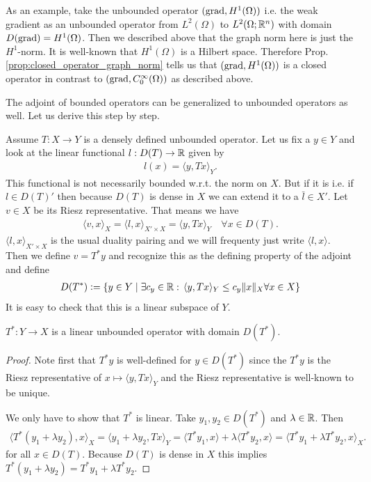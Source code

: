 \documentclass[../main.tex]{subfiles}
\begin{document}
As an example, take the unbounded operator $(\operatorname{grad}, H^1(\Omega))$
i.e. the weak gradient as an unbounded operator 
from $L^2(\Omega)$ to $L^2(\Omega;\mathbb{R}^n)$ with 
domain $D(\operatorname{grad}) = H^1(\Omega)$. Then we described above that the 
graph norm here is just the $H^1$-norm. It is well-known that 
$H^1(\Omega)$ is a Hilbert space. Therefore 
Prop.\,\ref{prop:closed_operator_graph_norm} tells us that 
$(\operatorname{grad}, H^1(\Omega))$ is a closed operator in contrast to 
$(\operatorname{grad}, C_0^\infty(\Omega))$ as described above.

The adjoint of bounded operators can be generalized to unbounded operators 
as well. Let us derive this step by step. 

Assume $T: X \rightarrow Y$ is a densely defined unbounded operator. 
Let us fix a $y \in Y$ and 
look at the linear functional $l:D(T) \rightarrow \mathbb{R}$ given by
\begin{align*}
    l(x) = \langle y, Tx \rangle_Y.
\end{align*}
This functional is not necessarily bounded w.r.t. the norm on $X$. But if it is i.e. if $l \in D(T)'$ 
then because $D(T)$ is dense in $X$ we can extend it to a
$\bar{l} \in X'$. Let $v \in X$ be its Riesz representative. That means we have
\begin{align*}
    \langle v, x \rangle_X = \langle l, x \rangle_{X'\times X} = \langle y, Tx \rangle_Y 
        \quad \forall x \in D(T).
\end{align*}
$\langle l, x \rangle_{X'\times X}$ is the usual duality pairing and we will 
frequenty just write $\langle l, x \rangle$.
Then we define $v = T^* y$ and 
recognize this as the defining property of the adjoint and define 
\begin{align*}
    D(T^*) \vcentcolon= \{ y \in Y \mid \exists c_y \in \mathbb{R}:
        \,\langle y, Tx \rangle_Y \leq c_y \lVert x \rVert _X \forall x \in X\}
\end{align*}
It is easy to check that this is a linear subspace of $Y$.

\begin{proposition}
    $T^*: Y \rightarrow X $ is a linear unbounded operator with domain $D(T^*)$.
\end{proposition}
\begin{proof}
    Note first that $T^*y$ is well-defined for $y \in D(T^*)$ since the 
    $T^*y$ is the Riesz representative of $x \mapsto \langle y, Tx \rangle_Y$ 
    and the Riesz representative is well-known to be unique.

    We only have to show that $T^*$ is linear. Take $y_1, y_2 \in D(T^*)$ 
    and $\lambda \in \mathbb{R}$. Then
    \begin{align*}
        \langle T^*(y_1 + \lambda y_2), x \rangle _X
        = \langle y_1 + \lambda y_2, Tx \rangle _Y
        = \langle T^*y_1, x \rangle + \lambda \langle T^*y_2, x \rangle
        = \langle T^*y_1 + \lambda T^*y_2, x\rangle_X.
    \end{align*}
    for all $x \in D(T)$. Because $D(T)$ is dense in $X$ this implies 
    $T^*(y_1 + \lambda y_2) = T^*y_1 + \lambda T^*y_2$.
\end{proof}
\end{document}
